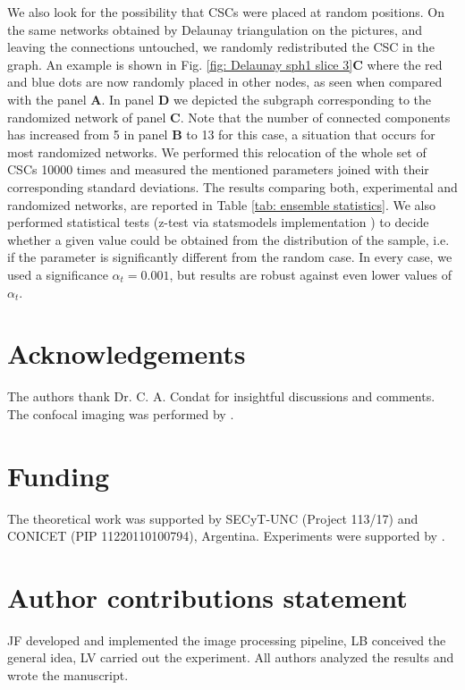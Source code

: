\documentclass[fleqn,10pt]{wlscirep}
\begin{document}
We also look for the possibility that CSCs were placed at random positions. On the same networks obtained by Delaunay triangulation on the pictures, and leaving the connections untouched, we randomly redistributed the CSC in the graph. An example is shown in Fig. \ref{fig: Delaunay sph1 slice 3}{\bf C} where the red and blue dots are now randomly placed in other nodes, as seen when compared with the panel {\bf A}. In panel {\bf D} we depicted the subgraph corresponding to the randomized network of panel {\bf C}. Note that the number of connected components has increased from 5 in panel {\bf B} to 13 for this case, a situation that occurs for most randomized networks. We performed this relocation of the whole set of CSCs 10000 times and measured the mentioned parameters joined with their corresponding standard deviations. The results comparing both, experimental and randomized networks, are reported in Table \ref{tab: ensemble statistics}. We also performed statistical tests (z-test via \textsf{statsmodels} implementation \cite{seabold2010statsmodels}) to decide whether a given value could be obtained from the distribution of the sample, i.e. if the parameter is significantly different from the random case. In every case, we used a significance $\alpha_{t}=0.001$, but results are robust against even lower values of $\alpha_{t}$.





\section*{Acknowledgements }
The authors thank Dr. C. A. Condat for insightful discussions and comments. The confocal imaging was performed by .

\section*{Funding}The theoretical work was supported by SECyT-UNC (Project 113/17) and CONICET (PIP 11220110100794), Argentina. Experiments were supported by . 

\section*{Author contributions statement}

JF developed and implemented the image processing pipeline, LB conceived the general idea,  LV carried out the experiment. All authors analyzed the results and wrote the manuscript. 
\end{document}
